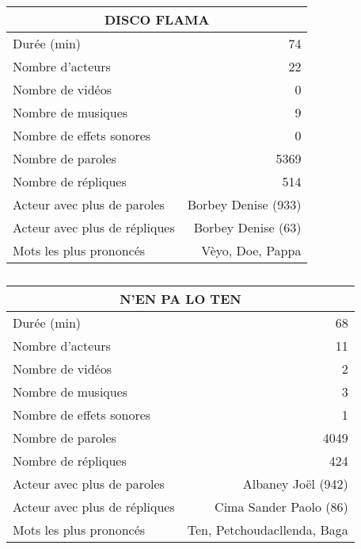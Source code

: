     \begin{table}[]
    \centering
    \caption{}
    \begin{tabular}{lr}\toprule\multicolumn{2}{c}{DISCO FLAMA} \\\midrule
\multicolumn{1}{l}{Durée (min)}&74\\
\multicolumn{1}{l}{Nombre d'acteurs}&22\\
\multicolumn{1}{l}{Nombre de vidéos}&0\\
\multicolumn{1}{l}{Nombre de musiques}&9\\
\multicolumn{1}{l}{Nombre de effets sonores}&0\\
\multicolumn{1}{l}{Nombre de paroles}&5369\\
\multicolumn{1}{l}{Nombre de répliques}&514\\
\multicolumn{1}{l}{Acteur avec plus de paroles}&Borbey Denise (933)\\
\multicolumn{1}{l}{Acteur avec plus de répliques}&Borbey Denise (63)\\
\multicolumn{1}{l}{Mots les plus prononcés}&Vèyo, Doe, Pappa\\
    \bottomrule
    \end{tabular}%
    \end{table}
    \begin{table}[]
    \centering
    \caption{}
    \begin{tabular}{lr}\toprule\multicolumn{2}{c}{N'EN PA LO TEN} \\\midrule
\multicolumn{1}{l}{Durée (min)}&68\\
\multicolumn{1}{l}{Nombre d'acteurs}&11\\
\multicolumn{1}{l}{Nombre de vidéos}&2\\
\multicolumn{1}{l}{Nombre de musiques}&3\\
\multicolumn{1}{l}{Nombre de effets sonores}&1\\
\multicolumn{1}{l}{Nombre de paroles}&4049\\
\multicolumn{1}{l}{Nombre de répliques}&424\\
\multicolumn{1}{l}{Acteur avec plus de paroles}&Albaney Joël (942)\\
\multicolumn{1}{l}{Acteur avec plus de répliques}&Cima Sander Paolo (86)\\
\multicolumn{1}{l}{Mots les plus prononcés}&Ten, Petchoudacllenda, Baga\\
    \bottomrule
    \end{tabular}%
    \end{table}
